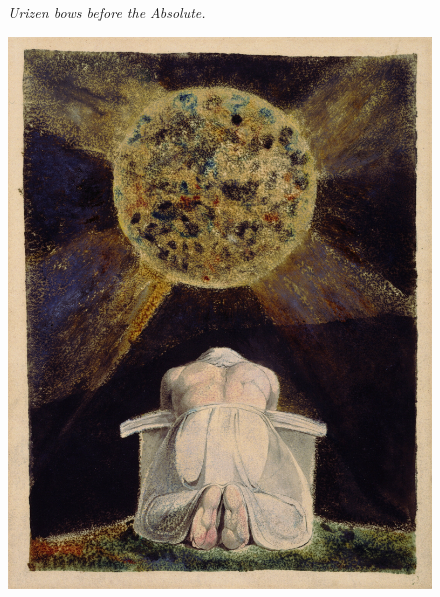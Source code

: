 \documentclass[11pt]{article}
\begin{document}
\begin{figure}[ht]
    \centering
\begin{minipage}[c]{0.45\textwidth}
        \small
        \textit{Urizen bows before the Absolute.}
    \end{minipage}    
    \hfill
    \begin{minipage}[c]{0.45\textwidth}
        \includegraphics[width=\linewidth]{assets/William_Blake_-_Sconfitta_-_Frontispiece_to_The_Song_of_Los.jpg} 
    \end{minipage}
\end{figure}
\newpage  
\end{document}
